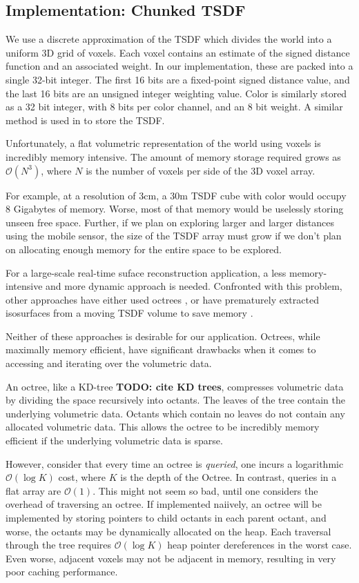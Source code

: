 \documentclass[conference,10pt]{IEEEtran}
\begin{document}
\subsection{Implementation: Chunked TSDF}
We use a discrete approximation of the TSDF which divides the world into
a uniform 3D grid of voxels. Each voxel contains an estimate of the signed
distance function and an associated weight. In our implementation, these are
packed into a single 32-bit integer. The first 16 bits are a fixed-point
signed distance value, and the last 16 bits  are an unsigned integer weighting
value. Color is similarly stored as a 32 bit integer, with 8 bits per color
channel, and an 8 bit weight. A similar method is used in \cite{Newcombe,
Whelan2013, Bylow2013} to store the TSDF.

Unfortunately, a flat volumetric representation of the world using voxels is
incredibly memory intensive. The amount of memory storage required grows as
$\mathcal{O}(N^3)$, where $N$ is the number of voxels per side of the 3D voxel
array.

For example, at a resolution of $3\text{cm}$,  a $30\text{m}$ TSDF cube with
color would occupy 8 Gigabytes of memory. Worse, most of that memory would be
uselessly storing unseen free space. Further, if we plan on exploring larger and larger
distances using the mobile sensor, the size of the TSDF array must grow if we
don't plan on allocating enough memory for the entire space to be explored.

For a large-scale real-time suface reconstruction application, a less
memory-intensive and more dynamic approach is needed. Confronted with this
problem, other approaches have either used  octrees \cite{Wurm2010}, or have
prematurely extracted isosurfaces from a moving TSDF volume to save memory
\cite{Whelan2013}.

Neither of these approaches is desirable for our application. Octrees, while
maximally memory efficient, have significant drawbacks when it comes to
accessing and iterating over the volumetric data.

An octree, like a KD-tree \textbf{TODO: cite KD trees}, compresses volumetric
data by dividing the space recursively into octants. The leaves of the tree
contain the underlying volumetric data. Octants which contain no leaves do not
contain any allocated volumetric data. This allows the octree to be incredibly
memory efficient if the underlying volumetric data is sparse. 

However, consider that every time an octree is \emph{queried}, one incurs a
logarithmic $\mathcal{O}(\log K)$ cost, where $K$ is the depth of the Octree. In
contrast, queries in a flat array are $\mathcal{O}(1)$. This might not seem so
bad, until one considers the overhead of traversing an octree. If implemented naiively, an
octree will be implemented by storing pointers to child octants in each parent
octant, and worse, the octants may be dynamically allocated on the heap. Each
traversal through the tree requires $\mathcal{O}(\log K)$ heap pointer
dereferences in the worst case. Even worse, adjacent voxels may not be adjacent
in memory, resulting in very poor caching performance.
\end{document}
